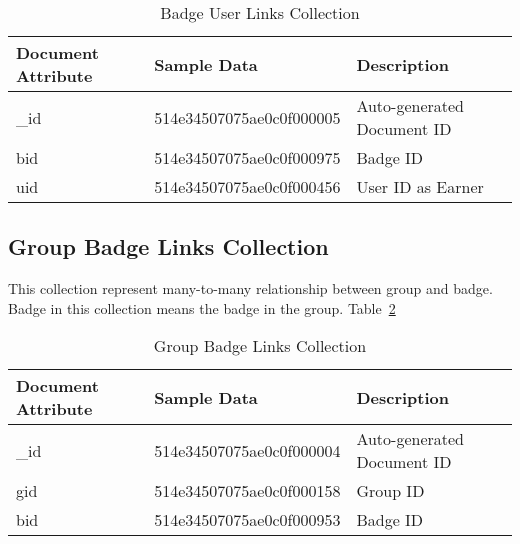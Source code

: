 \begin{table}[H]
\caption{Badge User Links Collection}\label{table:BadgeUserLinksCollection}
\textbf{ }
\begin{center}
\begin{tabular}{ | l | l |  l | }
\hline
Document Attribute & Sample Data & Description \\ \hline
{\_}id & 514e34507075ae0c0f000005 & Auto-generated Document ID \\ \hline
bid & 514e34507075ae0c0f000975 & Badge ID   \\ \hline
uid & 514e34507075ae0c0f000456 & User ID as Earner   \\ \hline
\end{tabular}
\end{center}
\end{table}


\subsection{Group Badge Links Collection}
This collection represent many-to-many relationship between group and badge. Badge in this collection means the badge in the group. Table~\ref{table:GroupBadgeLinksCollection}

\begin{table}[H]
\caption{Group Badge Links Collection}\label{table:GroupBadgeLinksCollection}
\textbf{ }
\begin{center}
\begin{tabular}{ | l | l |  l | }
\hline
Document Attribute & Sample Data & Description \\ \hline
{\_}id & 514e34507075ae0c0f000004 & Auto-generated Document ID \\ \hline
gid & 514e34507075ae0c0f000158 & Group ID   \\ \hline
bid & 514e34507075ae0c0f000953 & Badge ID    \\ \hline
\end{tabular}
\end{center}
\end{table}


